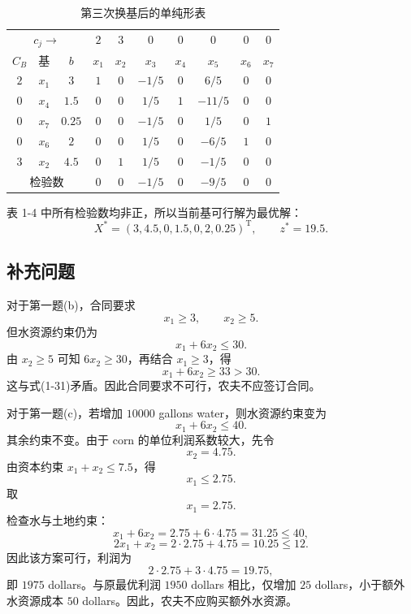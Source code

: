 ﻿\documentclass[UTF8,zihao=-4,fontset=none]{ctexart}
\begin{document}
\begin{table}[H]
\centering
{}
\setlength{\tabcolsep}{3pt}
\caption{第三次换基后的单纯形表}
\begin{tabular}{cccccccccc}
\toprule
\multicolumn{3}{c}{$c_j\rightarrow$} & \(2\) & \(3\) & \(0\) & \(0\) & \(0\) & \(0\) & \(0\)\\
\(C_B\) & 基 & \(b\) & \(x_1\) & \(x_2\) & \(x_3\) & \(x_4\) & \(x_5\) & \(x_6\) & \(x_7\)\\
\midrule
\(2\) & \(x_1\) & \(3\)    & \(1\) & \(0\) & \(-1/5\) & \(0\) & \(6/5\) & \(0\) & \(0\)\\
\(0\) & \(x_4\) & \(1.5\)  & \(0\) & \(0\) & \(1/5\)  & \(1\) & \(-11/5\) & \(0\) & \(0\)\\
\(0\) & \(x_7\) & \(0.25\) & \(0\) & \(0\) & \(-1/5\) & \(0\) & \(1/5\) & \(0\) & \(1\)\\
\(0\) & \(x_6\) & \(2\)    & \(0\) & \(0\) & \(1/5\)  & \(0\) & \(-6/5\) & \(1\) & \(0\)\\
\(3\) & \(x_2\) & \(4.5\)  & \(0\) & \(1\) & \(1/5\)  & \(0\) & \(-1/5\) & \(0\) & \(0\)\\
\multicolumn{3}{c}{检验数} & \(0\) & \(0\) & \(-1/5\) & \(0\) & \(-9/5\) & \(0\) & \(0\)\\
\bottomrule
\end{tabular}
\end{table}

表 1-4 中所有检验数均非正，所以当前基可行解为最优解：
\[
    X^*=(3,4.5,0,1.5,0,2,0.25)^{\mathrm T},\qquad z^*=19.5.
\]

\subsection{补充问题}

对于第一题(b)，合同要求
\[
    x_1\ge 3,\qquad x_2\ge 5. \tag{1-30}
\]
但水资源约束仍为
\[
    x_1+6x_2\le 30. \tag{1-31}
\]
由 \(x_2\ge 5\) 可知 \(6x_2\ge 30\)，再结合 \(x_1\ge 3\)，得
\[
    x_1+6x_2\ge 33>30.
\]
这与式(1-31)矛盾。因此合同要求不可行，农夫不应签订合同。

对于第一题(c)，若增加 \(10000\) gallons water，则水资源约束变为
\[
    x_1+6x_2\le 40. \tag{1-32}
\]
其余约束不变。由于 corn 的单位利润系数较大，先令
\[
    x_2=4.75.
\]
由资本约束 \(x_1+x_2\le 7.5\)，得
\[
    x_1\le 2.75.
\]
取
\[
    x_1=2.75.
\]
检查水与土地约束：
\[
    x_1+6x_2=2.75+6\cdot 4.75=31.25\le 40,
\]
\[
    2x_1+x_2=2\cdot 2.75+4.75=10.25\le 12.
\]
因此该方案可行，利润为
\[
    2\cdot 2.75+3\cdot 4.75=19.75,
\]
即 \(1975\) dollars。与原最优利润 \(1950\) dollars 相比，仅增加 \(25\) dollars，小于额外水资源成本 \(50\) dollars。因此，农夫不应购买额外水资源。
\end{document}
